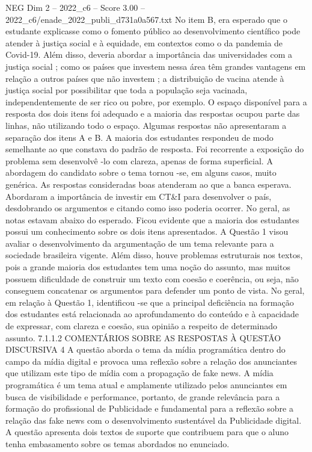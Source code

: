 \begin{textsample}{NEG Dim 2 – 2022\_c6 – Score 3.00 – 2022\_c6/enade\_2022\_publi\_d731a0a567.txt}
No item B, era esperado que o estudante explicasse como o fomento público ao desenvolvimento científico pode atender à justiça social e à equidade, em contextos como o da pandemia de Covid-19.
Além disso, deveria abordar a importância das universidades com a justiça social ; como os países que investem nessa área têm grandes vantagens em relação a outros países que não investem ; a distribuição de vacina atende à justiça social por possibilitar que toda a população seja vacinada, independentemente de ser rico ou pobre, por exemplo.
O espaço disponível para a resposta dos dois itens foi adequado e a maioria das respostas ocupou parte das linhas, não utilizando todo o espaço.
Algumas respostas não apresentaram a separação dos itens A e B.
A maioria dos estudantes respondeu de modo semelhante ao que constava do padrão de resposta.
Foi recorrente a exposição do problema sem desenvolvê -lo com clareza, apenas de forma superficial.
A abordagem do candidato sobre o tema tornou -se, em alguns casos, muito genérica.
As respostas consideradas boas atenderam ao que a banca esperava.
Abordaram a importância de investir em CT\&I para desenvolver o país, desdobrando os argumentos e citando como isso poderia ocorrer.
No geral, as notas estavam abaixo do esperado.
Ficou evidente que a maioria dos estudantes possui um conhecimento sobre os dois itens apresentados.
A Questão 1 visou avaliar o desenvolvimento da argumentação de um tema relevante para a sociedade brasileira vigente.
Além disso, houve problemas estruturais nos textos, pois a grande maioria dos estudantes tem uma noção do assunto, mas muitos possuem dificuldade de construir um texto com coesão e coerência, ou seja, não conseguem concatenar os argumentos para defender um ponto de vista.
No geral, em relação à Questão 1, identificou -se que a principal deficiência na formação dos estudantes está relacionada ao aprofundamento do conteúdo e à capacidade de expressar, com clareza e coesão, sua opinião a respeito de determinado assunto. 7.1.1.2 COMENTÁRIOS SOBRE AS RESPOSTAS À QUESTÃO DISCURSIVA 4 A questão aborda o tema da mídia programática dentro do campo da mídia digital e provoca uma reflexão sobre a relação dos anunciantes que utilizam este tipo de mídia com a propagação de fake news.
A mídia programática é um tema atual e amplamente utilizado pelos anunciantes em busca de visibilidade e performance, portanto, de grande relevância para a formação do profissional de Publicidade e fundamental para a reflexão sobre a relação das fake news com o desenvolvimento sustentável da Publicidade digital.
A questão apresenta dois textos de suporte que contribuem para que o aluno tenha embasamento sobre os temas abordados no enunciado.

\end{textsample}
